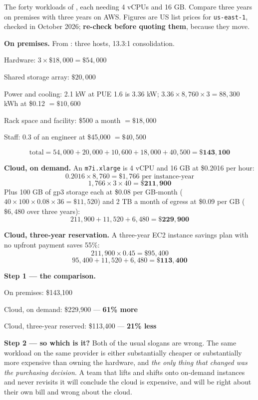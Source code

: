 \begin{worked}
The forty workloads of , each needing 4 vCPUs and 16 GB. Compare
three years on premises with three years on AWS. Figures are US list prices for
\texttt{us-east-1}, checked in October 2026; \textbf{re-check before quoting
them}, because they move.

\smallskip
\textbf{On premises.} From : three hosts, 13.3:1 consolidation.
\begin{tight}
  \item Hardware: $3 \times \$18{,}000 = \$54{,}000$
  \item Shared storage array: $\$20{,}000$
  \item Power and cooling: 2.1 kW at PUE 1.6 is 3.36 kW;
        $3.36 \times 8{,}760 \times 3 = 88{,}300$ kWh at \$0.12 $=
        \$10{,}600$
  \item Rack space and facility: \$500 a month $= \$18{,}000$
  \item Staff: 0.3 of an engineer at \$45{,}000 $= \$40{,}500$
\end{tight}
\[ \text{total} = 54{,}000 + 20{,}000 + 10{,}600 + 18{,}000 + 40{,}500
   = \mathbf{\$143{,}100} \]

\smallskip
\textbf{Cloud, on demand.} An \texttt{m7i.xlarge} is 4 vCPU and 16 GB at
\$0.2016 per hour:
\[ 0.2016 \times 8{,}760 = \$1{,}766 \text{ per instance-year} \]
\[ 1{,}766 \times 3 \times 40 = \mathbf{\$211{,}900} \]
Plus 100 GB of gp3 storage each at \$0.08 per GB-month
($40 \times 100 \times 0.08 \times 36 = \$11{,}520$) and 2 TB a month of egress
at \$0.09 per GB ($\$6{,}480$ over three years):
\[ 211{,}900 + 11{,}520 + 6{,}480 = \mathbf{\$229{,}900} \]

\smallskip
\textbf{Cloud, three-year reservation.} A three-year EC2 instance savings plan
with no upfront payment saves 55\%:
\[ 211{,}900 \times 0.45 = \$95{,}400 \]
\[ 95{,}400 + 11{,}520 + 6{,}480 = \mathbf{\$113{,}400} \]

\smallskip
\textbf{Step 1 --- the comparison.}
\begin{tight}
  \item On premises: \$143{,}100
  \item Cloud, on demand: \$229{,}900 --- \textbf{61\% more}
  \item Cloud, three-year reserved: \$113{,}400 --- \textbf{21\% less}
\end{tight}

\smallskip
\textbf{Step 2 --- so which is it?} Both of the usual slogans are wrong. The
same workload on the same provider is either substantially cheaper or
substantially more expensive than owning the hardware, and \emph{the only thing
that changed was the purchasing decision}. A team that lifts and shifts onto
on-demand instances and never revisits it will conclude the cloud is expensive,
and will be right about their own bill and wrong about the cloud.


\end{worked}
